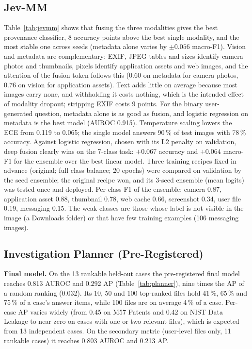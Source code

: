 \documentclass[conference]{IEEEtran}
\begin{document}
\subsection{Jev-MM}
Table~\ref{tab:jevmm} shows that fusing the three modalities gives the best provenance classifier, 8 accuracy points
above the best single modality, and the most stable one across seeds (metadata alone varies by $\pm0.056$ macro-F1).
Vision and metadata are complementary: EXIF, JPEG tables and sizes identify camera photos and thumbnails, pixels
identify application assets and web images, and the attention of the fusion token follows this (0.60 on metadata for
camera photos, 0.76 on vision for application assets). Text adds little on average because most images carry none,
and withholding it costs nothing, which is the intended effect of modality dropout; stripping EXIF costs 9 points.
For the binary user-generated question, metadata alone is as good as fusion, and logistic regression on metadata is
the best model (AUROC 0.915). Temperature scaling lowers the ECE from 0.119 to 0.065; the single model answers 90\,\%
of test images with 78\,\% accuracy. Against logistic regression, chosen with its L2 penalty on validation, deep
fusion clearly wins on the 7-class task: $+0.067$ accuracy and $+0.064$ macro-F1 for the ensemble over the best
linear model. Three training recipes fixed in advance (original; full class balance; 20 epochs) were compared on
validation by the seed ensemble; the original recipe won, and its 3-seed ensemble (mean logits) was tested once
and deployed. Per-class F1 of the ensemble: camera 0.87, application asset 0.88, thumbnail 0.78, web cache 0.66,
screenshot 0.34, user file 0.19, messaging 0.15. The weak classes are those whose label is not visible in the image
(a Downloads folder) or that have few training examples (106 messaging images).

\subsection{Investigation Planner (Pre-Registered)}
\textbf{Final model.} On the 13 rankable held-out cases the pre-registered final model reaches 0.813 AUROC and 0.292
AP (Table~\ref{tab:planner}), nine times the AP of a random ranking (0.032). Its 10, 50 and 100 top-ranked files hold
41\,\%, 65\,\% and 75\,\% of a case's answer items, while 100 files are on average 4\,\% of a case. Per-case AP varies
widely (from 0.45 on M57 Patents and 0.42 on NIST Data Leakage to near zero on cases with one or two relevant files),
which is expected from 13 independent cases. On the secondary metric (user-level files only, 11 rankable cases) it
reaches 0.803 AUROC and 0.213 AP.
\end{document}
